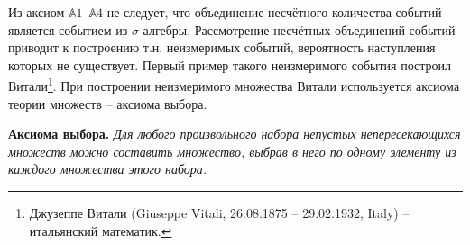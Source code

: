 \begin{zam}
Из аксиом $\mathbb{A}1$--$\mathbb{A}4$ не следует, что объединение несчётного количества событий является событием из $\sigma$-алгебры. Рассмотрение несчётных объединений событий приводит к построению т.н. неизмеримых событий, вероятность наступления которых не существует. Первый пример
такого неизмеримого события построил Витали\footnote{Джузеппе Витали (Giuseppe Vitali, 26.08.1875 -- 29.02.1932, Italy) -- итальянский математик.}. При построении неизмеримого множества Витали используется аксиома теории множеств -- аксиома
выбора.
\end{zam}

\textbf{Аксиома выбора.} \textit{Для любого произвольного набора непустых непересекающихся множеств можно составить множество, выбрав в него по одному элементу из каждого множества этого набора.}

